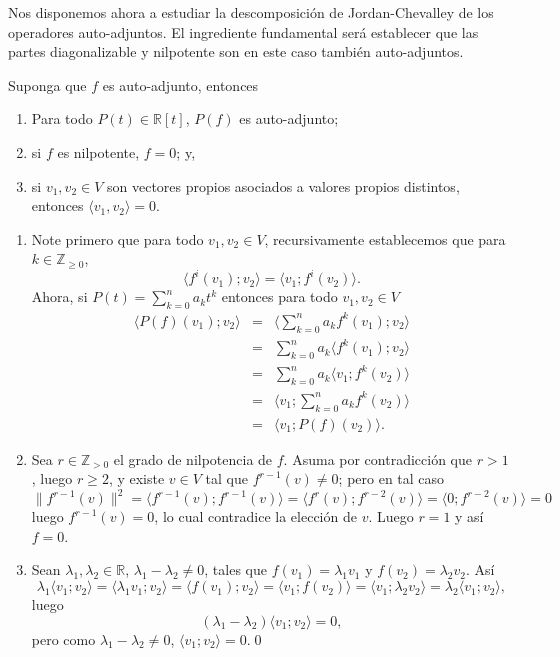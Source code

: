 \begin{obs}
Nos disponemos ahora a estudiar la descomposici\'on de Jordan-Chevalley de los operadores auto-adjuntos. El ingrediente fundamental ser\'a establecer que las partes diagonalizable y nilpotente son en este caso tambi\'en auto-adjuntos. 
\end{obs}

\begin{lema} Suponga que $f$ es auto-adjunto, entonces
\begin{enumerate}
\item Para todo $P(t)\in\mathbb{R}[t]$, $P(f)$ es auto-adjunto;
\item si $f$ es nilpotente, $f=0$; y,
\item si $v_1,v_2\in V$ son vectores propios asociados a valores propios distintos, entonces $\langle v_1,v_2\rangle=0$.
\end{enumerate}
\end{lema}

\dem
\begin{enumerate}
\item Note primero que para todo $v_1,v_2\in V$, recursivamente establecemos que para $k\in\mathbb{Z}_{\ge 0}$,
\[
\langle f^i(v_1);v_2\rangle = \langle v_1;f^i(v_2)\rangle.
\]
Ahora, si $P(t)=\sum_{k=0}^na_kt^k$ entonces para todo $v_1,v_2\in V$
\begin{eqnarray*}
\langle P(f)(v_1);v_2 \rangle & = & \langle \sum_{k=0}^na_kf^k(v_1); v_2 \rangle\\
 & = & \sum_{k=0}^n a_k\langle f^k(v_1);v_2\rangle\\
 & = & \sum_{k=0}^n a_k\langle v_1;f^k(v_2)\rangle\\
 & = & \langle v_1;\sum_{k=0}^na_kf^k(v_2)\rangle\\
 & = & \langle v_1;P(f)(v_2)\rangle.
\end{eqnarray*}
\item Sea $r\in\mathbb{Z}_{>0}$ el grado de nilpotencia de $f$. Asuma por contradicci\'on que $r>1$, luego $r\ge 2$, y existe $v\in V$ tal que $f^{r-1}(v)\ne 0$; pero en tal caso
\[
\| f^{r-1}(v)\|^2=\langle f^{r-1}(v);f^{r-1}(v) \rangle=\langle f^r(v);f^{r-2}(v)\rangle=\langle 0;f^{r-2}(v)\rangle=0
\]
luego $f^{r-1}(v)=0$, lo cual contradice la elecci\'on de $v$. Luego $r=1$ y as\'i $f=0$.
\item Sean $\lambda_1,\lambda_2\in\mathbb{R}$, $\lambda_1-\lambda_2\ne 0$, tales que $f(v_1)=\lambda_1v_1$ y $f(v_2)=\lambda_2v_2$. As\'i
\[
\lambda_1\langle v_1;v_2\rangle=\langle\lambda_1v_1;v_2\rangle=\langle f(v_1);v_2\rangle=\langle v_1;f(v_2)\rangle=\langle v_1;\lambda_2v_2\rangle=\lambda_2\langle v_1;v_2\rangle,
\]
luego
\[
(\lambda_1-\lambda_2)\langle v_1;v_2\rangle=0,
\]
pero como $\lambda_1-\lambda_2\ne 0$, $\langle v_1;v_2\rangle=0$.\qed
\end{enumerate}

